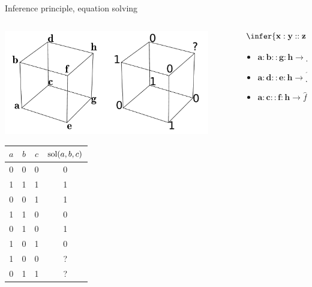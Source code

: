 \documentclass{beamer}
\begin{document}
\begin{frame}{Inference principle, equation solving}
  \begin{columns}
    \begin{column}{0.4\textwidth}
      \begin{center}
        \includegraphics[width=0.9\textwidth]{figures/classification_problem.pdf}
      \end{center}
      {\tiny
        \begin{table}[t]
          \centering
          \begin{tabular}[t]{cccc}
            \toprule
            $a$ & $b$ & $c$ & $\text{sol}(a, b, c)$ \\
            \midrule
            0 & 0 & 0 & 0 \\
            1 & 1 & 1 & 1 \\
            0 & 0 & 1 & 1 \\
            1 & 1 & 0 & 0 \\
            0 & 1 & 0 & 1 \\
            1 & 0 & 1 & 0 \\
            1 & 0 & 0 &?\\
            0 & 1 & 1 &?\\
            \bottomrule
          \end{tabular}
        \end{table}
      }
    \end{column}
    \begin{column}{0.5\textwidth}
      $$
      \infer{\mathbf{x} : \mathbf{y} ::
      \mathbf{z} : \mathbf{t}}{f(\mathbf{x}) : f(\mathbf{y}) :: f(\mathbf{z}) :
      f(\mathbf{t})}
      $$
      \begin{itemize}
        \item $\mathbf{a} : \mathbf{b} :: \mathbf{g} : \mathbf{h} \rightarrow
          \hat{f}(\mathbf{h}) = 1$
        \item $\mathbf{a} : \mathbf{d} :: \mathbf{e} : \mathbf{h}\rightarrow
          \hat{f}(\mathbf{h}) = 1$
        \item $\mathbf{a} : \mathbf{c} :: \mathbf{f} : \mathbf{h}\rightarrow
          \hat{f}(\mathbf{h}) = 1$
      \end{itemize}

    \end{column}
  \end{columns}
\end{frame}
\end{document}
